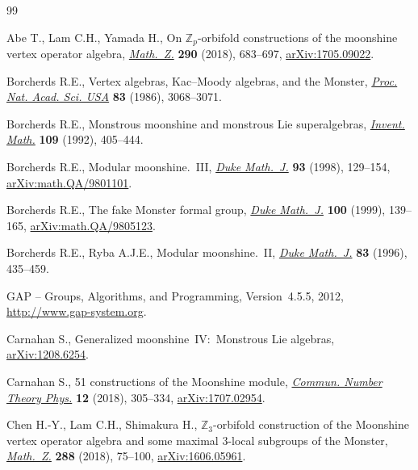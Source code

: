 \documentclass[pdftex]{sigma}
\theoremstyle{definition}
\begin{document}
\begin{thebibliography}{99}
\footnotesize\itemsep=0pt

Abe T., Lam C.H., Yamada H., On {${\mathbb Z}_p$}-orbifold constructions of the
 moonshine vertex operator algebra, \href{https://doi.org/10.1007/s00209-017-2036-3}{\textit{Math.~Z.}} \textbf{290} (2018),
 683--697, \href{https://arxiv.org/abs/1705.09022}{arXiv:1705.09022}.

Borcherds R.E., Vertex algebras, {K}ac--{M}oody algebras, and the {M}onster,
 \href{https://doi.org/10.1073/pnas.83.10.3068}{\textit{Proc. Nat. Acad. Sci. USA}} \textbf{83} (1986), 3068--3071.

Borcherds R.E., Monstrous moonshine and monstrous {L}ie superalgebras,
 \href{https://doi.org/10.1007/BF01232032}{\textit{Invent. Math.}} \textbf{109} (1992), 405--444.

Borcherds R.E., Modular moonshine.~{III}, \href{https://doi.org/10.1215/S0012-7094-98-09305-X}{\textit{Duke Math.~J.}} \textbf{93}
 (1998), 129--154, \href{https://arxiv.org/abs/math.QA/9801101}{arXiv:math.QA/9801101}.

Borcherds R.E., The fake {M}onster formal group, \href{https://doi.org/10.1215/S0012-7094-99-10005-6}{\textit{Duke Math.~J.}}
 \textbf{100} (1999), 139--165, \href{https://arxiv.org/abs/math.QA/9805123}{arXiv:math.QA/9805123}.

Borcherds R.E., Ryba A.J.E., Modular moonshine.~{II}, \href{https://doi.org/10.1215/S0012-7094-96-08315-5}{\textit{Duke Math.~J.}}
 \textbf{83} (1996), 435--459.

GAP -- Groups, Algorithms, and Programming, {V}ersion~4.5.5, 2012,
 \url{http://www.gap-system.org}.

Carnahan S., Generalized moonshine~{IV}:~{M}onstrous {L}ie algebras,
 \href{https://arxiv.org/abs/1208.6254}{arXiv:1208.6254}.

Carnahan S., 51 constructions of the {M}oonshine module, \href{https://doi.org/10.4310/cntp.2018.v12.n2.a3}{\textit{Commun. Number
 Theory Phys.}} \textbf{12} (2018), 305--334, \href{https://arxiv.org/abs/1707.02954}{arXiv:1707.02954}.

Chen H.-Y., Lam C.H., Shimakura H., {${\mathbb Z}_3$}-orbifold construction of
 the {M}oonshine vertex operator algebra and some maximal 3-local subgroups of
 the {M}onster, \href{https://doi.org/10.1007/s00209-017-1878-z}{\textit{Math.~Z.}} \textbf{288} (2018), 75--100,
 \href{https://arxiv.org/abs/1606.05961}{arXiv:1606.05961}.


\end{thebibliography}
\end{document}

